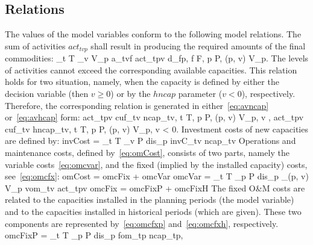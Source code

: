 \documentclass[a4paper,12pt]{article}
\begin{document}
\begin{comment}
\item $inp_{ctv}$: amount of input required by the unit of the corresponding activity
\item $omcC_{tv}$: unit OMC of activity
\item $extP_{cp}$: unit price of external input resources
\end{comment}
\etl

\subsection{Relations}\label{sec:rel}
The values of the model variables conform to the following model relations.
\inum The sum of activities $act_{tvp}$ shall result in producing the required
	amounts of the final commodities:
	\be
	\sum_{t \in T} \sum_{v \in V_p} a_{tvf} \cdot act_{tpv} \ge d_{fp}, \quad
		f \in F,\; p \in P,\; (p, v) \in V_p.
	\ee
\inum The levels of activities cannot exceed the corresponding available
	capacities. This relation holds for two situation, namely, when the
	capacity is defined by either the decision variable (then $v \ge 0$)
	or by the $hncap$ parameter ($v < 0$), respectively.
	Therefore, the corresponding relation is generated in either~\eqref{eq:avncap}
	or~\eqref{eq:avhcap} form:
	\be\label{eq:avncap}
		act_{tpv} \le cuf_{tv} \cdot ncap_{tv}, \quad t \in T,\; p \in P,\;
		(p, v) \in V_p,\; v ,
	\ee
	\be\label{eq:avhcap}
		act_{tpv} \le cuf_{tv} \cdot hncap_{tv}, \quad t \in T,\; p \in P,\;
		(p, v) \in V_p,\; v < 0.
	\ee
\inum Investment costs of new capacities are defined by:
	\be
		invCost = \sum_{t \in T} \sum_{v \in P} dis_p \cdot invC_{tv} \cdot ncap_{tv}
	\ee
\inum Operations and maintenance costs, defined by~\eqref{eq:omCost}, consists of 
	two parts, namely the variable costs~\eqref{eq:omcvar}, and the fixed
	(implied by the installed capacity) costs, see~\eqref{eq:omcfx}:
	\be\label{eq:omCost}
		omCost = omcFix + omcVar
	\ee
	\be\label{eq:omcvar}
		omcVar = \sum_{t \in T} \sum_{p \in P}\; dis_p \sum_{(p, v) \in V_p}
			vom_{tv} \cdot act_{tpv}
	\ee
	\be\label{eq:omcfx}
		omcFix = omcFixP + omcFixH
	\ee
	The fixed O\&M costs are related to the capacities installed in the planning
	periods (the model variable) and to the capacities installed in historical
	periods (which are given).
	These two components are represented by~\eqref{eq:omcfxp} and~\eqref{eq:omcfxh},
	respectively.
	\be\label{eq:omcfxp}
		omcFixP = \sum_{t \in T} \sum_{p \in P} dis_p \cdot fom_{tp} \cdot ncap_{tp},
	\ee
	\be\label{eq:omcfxh}
\end{document}
